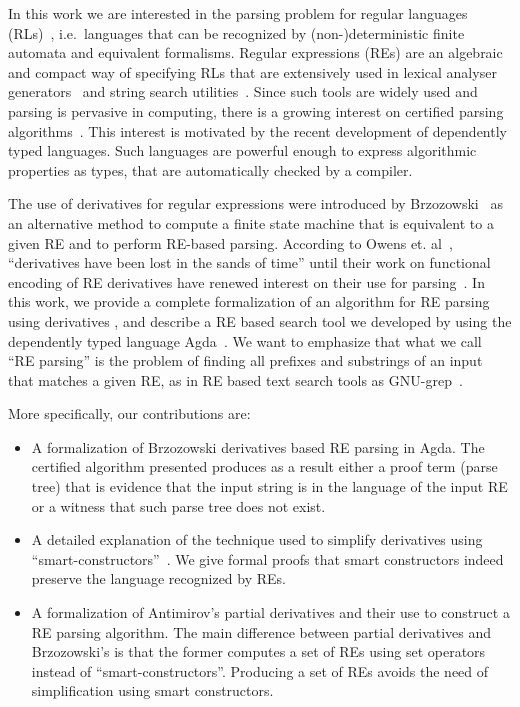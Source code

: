 \documentclass[review]{elsarticle}
\theoremstyle{definition}
\begin{document}
In this work we are interested in the parsing problem for regular
languages (RLs)~\cite{Hopcroft2000}, i.e.~languages that can be
recognized by (non-)deterministic finite automata and equivalent
formalisms. Regular expressions (REs) are an algebraic and compact way
of specifying RLs that are extensively used in lexical analyser
generators~\cite{Lesk1990} and string search utilities~\cite{Grep}.
Since such tools are widely used and parsing is pervasive in
computing, there is a growing interest on certified parsing
algorithms~\cite{FirsovU13,Firsov14,Danielsson2010}.  This interest
is motivated by the recent development of dependently typed
languages. Such languages are powerful enough to express algorithmic
properties as types, that are automatically checked by a compiler.

The use of derivatives for regular expressions were introduced by
Brzozowski~\cite{Brzozowski1964} as an alternative method to compute a
finite state machine that is equivalent to a given RE and to perform
RE-based parsing. According to Owens et. al~\cite{Owens2009},
``derivatives have been lost in the sands of time'' until their work on
functional encoding of RE derivatives have renewed interest on their use
for parsing~\cite{Might2011,Fischer2010}.  In this work, we provide a
complete formalization of an algorithm for RE parsing using
derivatives \cite{Owens2009}, and describe a RE based search tool we developed by 
using the dependently typed language
Agda~\cite{Norell2009}. We want to emphasize that what we call ``RE parsing''
is the problem of finding all prefixes and substrings of an input that matches
a given RE, as in RE based text search tools as GNU-grep~\cite{Grep}.

More specifically, our contributions are:
\begin{itemize}
  \item A formalization of Brzozowski derivatives based RE parsing in
    Agda. The certified algorithm presented produces as a result
    either a proof term (parse tree) that is evidence that the input
    string is in the language of the input RE or a witness that such
    parse tree does not exist.

  \item A detailed explanation of the technique used to simplify
    derivatives using ``smart-constructors''~\cite{Owens2009}.
    We give formal proofs that smart constructors indeed preserve
    the language recognized by REs.

  \item A formalization of Antimirov's partial derivatives and their use to
    construct a RE parsing algorithm. The main difference between
    partial derivatives and Brzozowski's is that the former computes a
    set of REs using set operators instead of ``smart-constructors''.
    Producing a set of REs avoids the need of simplification using
    smart constructors.
\end{itemize}
\end{document}
